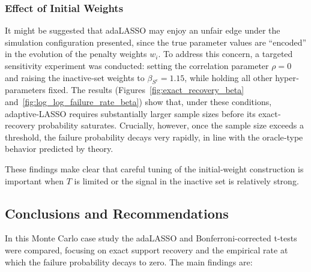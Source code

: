 \documentclass[10pt,a4paper,oneside]{article}
\begin{document}
\subsubsection{Effect of Initial Weights}

It might be suggested that adaLASSO may enjoy an unfair edge under the simulation configuration presented, since the true parameter values are “encoded” in the evolution of the penalty weights \(w_i\). To address this concern, a targeted sensitivity experiment was conducted: setting the correlation parameter \(\rho=0\) and raising the inactive‐set weights to \(\beta_{S^c}=1.15\), while holding all other hyper‐parameters fixed. The results (Figures~\ref{fig:exact_recovery_beta} and~\ref{fig:log_log_failure_rate_beta}) show that, under these conditions, adaptive‐LASSO requires substantially larger sample sizes before its exact‐recovery probability saturates. Crucially, however, once the sample size exceeds a threshold, the failure probability decays very rapidly, in line with the oracle‐type behavior predicted by theory.

These findings make clear that careful tuning of the initial‐weight construction is important when \(T\) is limited or the signal in the inactive set is relatively strong.

\subsection{Conclusions and Recommendations}
\label{subsec:conclusions_and_recommendations}

In this Monte Carlo case study the adaLASSO and Bonferroni-corrected t-tests were compared, focusing on exact support recovery and the empirical rate at which the failure probability decays to zero.  The main findings are:
\end{document}
